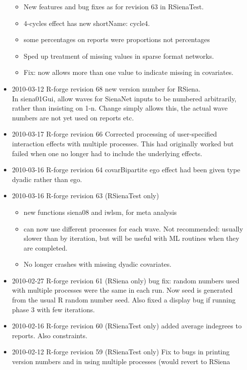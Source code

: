 \documentclass[a4paper,fleqn,11pt]{article}
\newcommand{\+}{\, + \,}
\newcommand{\sfn}[1]{\textsf{#1}}
\newcommand{\R}{{\sf R }}
\begin{document}
\begin{small}
\begin{itemize}
\begin{itemize}
\item New features and bug fixes as for revision 63 in \textsf{RSienaTest}.
\item 4-cycles effect has new shortName: cycle4.
\item some percentages on reports were proportions not percentages
\item Sped up treatment of missing values in sparse format networks.
\item Fix: now allows more than one value to indicate missing in covariates.
\end{itemize}
\item 2010-03-12 R-forge revision 68 new version number for RSiena.\\
In \sfn{siena01Gui}, allow waves for SienaNet inputs to be numbered
arbitrarily, rather than insisting on 1-n. Change simply allows this, the actual
wave numbers are not yet used on reports etc.
\item 2010-03-17 R-forge revision 66
Corrected processing of user-specified interaction effects with multiple
processes. This had originally worked but failed when one no longer had to
include the underlying effects.
\item 2010-03-16 R-forge revision 64
covarBipartite ego effect had been given type dyadic rather than ego.
\item 2010-03-16 R-forge revision 63 (RSienaTest only)
\begin{itemize}
\item new functions \textsf{siena08} and \sfn{iwlsm}, for meta analysis
\item can now use different processes for each wave. Not recommended: usually
  slower than by iteration, but will be useful with ML routines when they are
  completed.
\item No longer crashes with missing dyadic covariates.
\end{itemize}
\item 2010-02-27 R-forge revision 61 (RSiena only) bug fix: random numbers used
  with multiple processes were the same in each run. Now seed is generated
  from the usual \R random number seed. Also fixed a display bug if running
  phase 3 with few iterations.
\item 2010-02-16 R-forge revision 60 (RSienaTest only) added average indegrees
  to reports. Also constraints.
\item 2010-02-12 R-forge revision 59 (RSienaTest only) Fix to bugs in printing
  version numbers and in using multiple processes (would revert to RSiena

\end{itemize}
\end{small}
\end{document}
